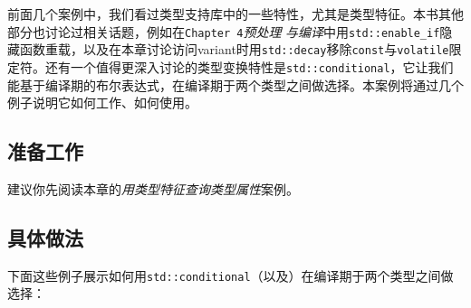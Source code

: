 
前面几个案例中，我们看过类型支持库中的一些特性，尤其是类型特征。本书其他部分也讨论过相关话题，例如在\texttt{Chapter 4}\textit{预处理} \textit{与编译}中用\texttt{std::\allowbreak{}enable\_\allowbreak{}if}隐藏函数重载，以及在本章讨论访问variant时用\texttt{std::\allowbreak{}decay}移除\texttt{const}与\texttt{volatile}限定符。还有一个值得更深入讨论的类型变换特性是\texttt{std::\allowbreak{}conditional}，它让我们能基于编译期的布尔表达式，在编译期于两个类型之间做选择。本案例将通过几个例子说明它如何工作、如何使用。



\subsection{准备工作}



建议你先阅读本章的\textit{用类型特征查询类型属性}案例。



\subsection{具体做法}



下面这些例子展示如何用\texttt{std::\allowbreak{}conditional}（以及）在编译期于两个类型之间做选择：



